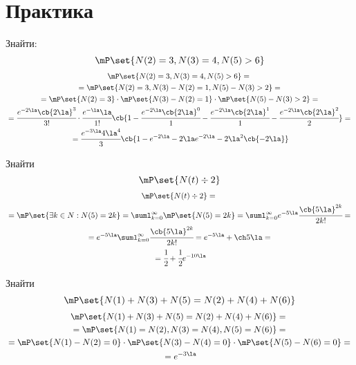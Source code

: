 \section{Практика}
\begin{tsk}
	Знайти:
	\begin{equation}
		\mP\set{N(2)=3,N(3)=4,N(5)>6}
	\end{equation}
	\begin{multline}
		\mP\set{N(2)=3,N(3)=4,N(5)>6} ={}\\{}= \mP\set{N(2)=3,N(3)-N(2)=1,N(5)-N(3)>2} = {}\\ {} =\mP\set{N(2)=3}\cdot \mP\set{N(3)-N(2)=1} \cdot \mP\set{N(5)-N(3)>2} ={}\\{}= \cfrac{e^{-2\la} \cb{2\la}^3}{3!} \cdot \cfrac{e^{-\la} \la }{1!} \cb{1 - \cfrac{e^{-2\la}\cb{2\la}^0}{1} - \cfrac{e^{-2\la}\cb{2\la}^1}{1} - \cfrac{e^{-2\la}\cb{2\la}^2}{2}} ={}\\{}= \cfrac{e^{-3\la} 4 \la^4}{3} \cb{1 - e^{-2\la} - 2\la e^{-2\la} - 2\la^2 \cb{-2\la}}
	\end{multline}
\end{tsk}
\begin{tsk}
	Знайти
	\begin{equation}
		\mP\set{N(t)\div2}
	\end{equation}
	\begin{multline}
		\mP\set{N(t)\div2} = {}\\{} = \mP\set{\exists k\in N: N(5) = 2k} = \suml_{k=0}^\infty \mP\set{N(5)= 2k}  = \suml_{k=0}^\infty e^{-5\la} \cfrac{\cb{5\la}^{2k}}{2k!} = {} \\ {} = e^{-5\la} \suml_{k=0}^\infty  \cfrac{\cb{5\la}^{2k}}{2k!} = e^{-5\la} + \ch 5\la ={}\\{} = \cfrac12 + \cfrac12 e^{-10\la}
	\end{multline}
\end{tsk}
\begin{tsk}
	Знайти
	\begin{equation}
		\mP\set{N(1)+N(3)+N(5) = N(2)+N(4)+N(6)}
	\end{equation}
	\begin{multline}
		\mP\set{N(1)+N(3)+N(5) = N(2)+N(4)+N(6)} ={}\\{}= \mP\set{N(1)=N(2),N(3)=N(4),N(5)=N(6)} ={}\\{}= \mP\set{N(1)-N(2)=0}\cdot \mP\set{N(3)-N(4)=0} \cdot \mP\set{N(5)-N(6)=0}  ={}\\{} = e^{-3\la}
	\end{multline}
\end{tsk}
